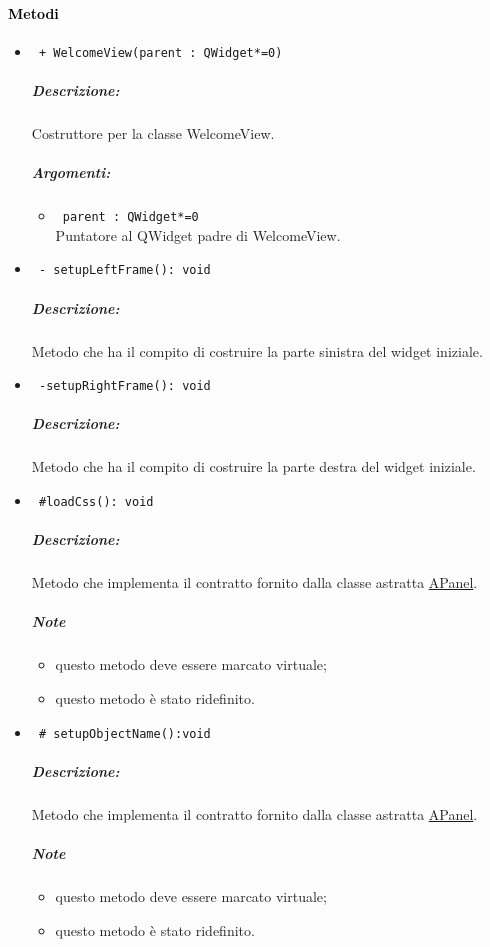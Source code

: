 \paragraph{\textcolor{black}{Metodi\\}}
\begin{itemize}
\item\color{blue}\verb! + WelcomeView(parent : QWidget*=0)!
\color{black}
\subparagraph{Descrizione: }Costruttore per la classe WelcomeView. \\
\subparagraph{Argomenti:}
\begin{itemize}
\item \color{RoyalPurple} \verb! parent : QWidget*=0 !\\ Puntatore al QWidget padre di WelcomeView.
\end{itemize}

\item\color{blue}\verb! - setupLeftFrame(): void!
\color{black}
\subparagraph{Descrizione: }Metodo che ha il compito di costruire la parte sinistra del widget iniziale.

\item\color{blue}\verb! -setupRightFrame(): void !
\color{black}
\subparagraph{Descrizione: }Metodo che ha il compito di costruire la parte destra del widget iniziale.

\item\color{blue}\verb! #loadCss(): void !
\color{black} 
\subparagraph{Descrizione: }Metodo che implementa il contratto fornito dalla classe astratta \hyperref[speAPanel]{APanel}.\\
 \subparagraph{Note}
 \begin{itemize}
  \item questo metodo deve essere marcato virtuale;
 \item questo metodo è stato ridefinito.
 \end{itemize}

\item\color{blue}\verb! # setupObjectName():void!
\color{black}
\subparagraph{Descrizione: }
Metodo che implementa il contratto fornito dalla classe astratta \hyperref[speAPanel]{APanel}.\\
 \subparagraph{Note}
 \begin{itemize}
  \item questo metodo deve essere marcato virtuale;
 \item questo metodo è stato ridefinito.
 \end{itemize}
 

\end{itemize}
